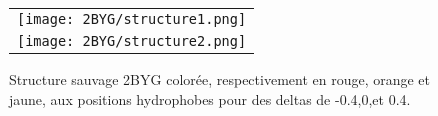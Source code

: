     \clearpage

   \begin{figure}[t]
     \centering
     \begin{tabular}{c}
       \texttt{[image: 2BYG/structure1.png]} \\
       \texttt{[image: 2BYG/structure2.png]} \\
     \end{tabular}
     \caption{Structure sauvage 2BYG colorée, respectivement en rouge, orange et jaune, aux positions hydrophobes  pour des deltas de -0.4,0,et 0.4.}
\label{result:PDZ_seed}
   \end{figure}





